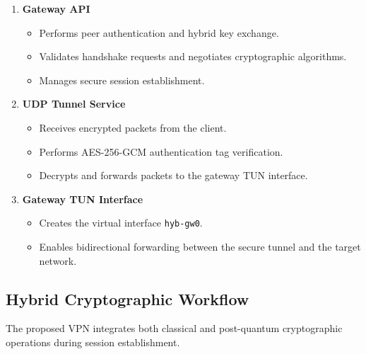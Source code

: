 \begin{enumerate}
    \item \textbf{Gateway API}
    \begin{itemize}
        \item Performs peer authentication and hybrid key exchange.
        \item Validates handshake requests and negotiates cryptographic algorithms.
        \item Manages secure session establishment.
    \end{itemize}

    \item \textbf{UDP Tunnel Service}
    \begin{itemize}
        \item Receives encrypted packets from the client.
        \item Performs AES-256-GCM authentication tag verification.
        \item Decrypts and forwards packets to the gateway TUN interface.
    \end{itemize}

    \item \textbf{Gateway TUN Interface}
    \begin{itemize}
        \item Creates the virtual interface \texttt{hyb-gw0}.
        \item Enables bidirectional forwarding between the secure tunnel and the target network.
    \end{itemize}
\end{enumerate}

\subsection{Hybrid Cryptographic Workflow}

The proposed VPN integrates both classical and post-quantum cryptographic operations during session establishment.


